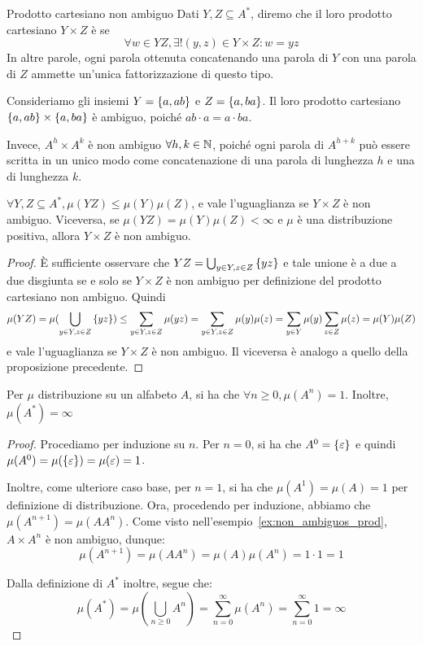 \begin{definition}{Prodotto cartesiano non ambiguo}
  Dati \(Y,Z \subseteq A^*\), diremo che il loro prodotto cartesiano \(Y\times Z\) è  se
    \[\forall w \in YZ, \exists! (y,z) \in Y \times Z : w = yz\]
  In altre parole, ogni parola ottenuta concatenando una parola di \(Y\) con una parola di \(Z\) ammette un'unica fattorizzazione di questo tipo.
\end{definition}

\begin{example}[label=ex:non_ambiguos_prod]{}
  Consideriamo gli insiemi \(Y = \set{a,ab}\) e \(Z = \set{a,ba}\).
  Il loro prodotto cartesiano \(\set{a,ab}\times\set{a,ba}\) è ambiguo, poiché \(ab\cdot a = a\cdot ba\).

  Invece, \(A^h\times A^k\) è non ambiguo \(\forall h,k \in \mathbb{N}\), poiché ogni parola di \(A^{h+k}\) può essere scritta in un unico modo come concatenazione di una parola di lunghezza \(h\) e una di lunghezza \(k\).
\end{example}
\begin{proposition}[label=prop:distribution_distributivity_over_product]{}
  \(\forall Y,Z \subseteq A^*, \mu(YZ) \leq \mu(Y)\mu(Z)\), e vale l'uguaglianza se \(Y\times Z\) è non ambiguo.
  Viceversa, se \(\mu(YZ) = \mu(Y)\mu(Z) < \infty\) e \(\mu\) è una distribuzione positiva, allora \(Y\times Z\) è non ambiguo.
\end{proposition}
\begin{proof}
  È sufficiente osservare che \(YZ = \bigcup_{y\in Y, z \in Z}\set{yz}\) e tale unione è a due a due disgiunta se e solo se \(Y\times Z\) è non ambiguo per definizione del prodotto cartesiano non ambiguo.
  Quindi
  \[\mu(YZ) = \mu(\bigcup_{y\in Y, z \in Z}\set{yz}) \leq \sum_{y\in Y, z \in Z}\mu(yz) = \sum_{y\in Y, z \in Z}\mu(y)\mu(z) =\sum_{y \in Y}\mu(y) \sum_{z \in Z}\mu(z) = \mu(Y)\mu(Z)\]
  e vale l'uguaglianza se \(Y\times Z\) è non ambiguo.
  Il viceversa è analogo a quello della proposizione precedente.
\end{proof}

\begin{proposition}[label=prop:A_power_mesure_1]{}
  Per \(\mu\) distribuzione su un alfabeto \(A\), si ha che \(\forall n \geq 0, \mu(A^n) = 1\).
  Inoltre, \(\mu(A^*) = \infty\)
\end{proposition}
\begin{proof}
  Procediamo per induzione su \(n\).
  Per \(n=0\), si ha che \(A^0 = \set{\varepsilon}\) e quindi \(\mu(A^0) = \mu(\set{\varepsilon}) = \mu(\varepsilon) = 1\).

  Inoltre, come ulteriore caso base, per \(n=1\), si ha che \(\mu(A^1) = \mu(A) = 1\) per definizione di distribuzione.
  Ora, procedendo per induzione, abbiamo che \(\mu(A^{n+1}) = \mu(AA^n)\).
  Come visto nell'esempio~\ref{ex:non_ambiguos_prod}, \(A \times A^n\) è non ambiguo, dunque:
  \[\mu(A^{n+1}) = \mu(AA^n) = \mu(A)\mu(A^n) = 1 \cdot 1 = 1 \]

  Dalla definizione di \(A^*\) inoltre, segue che:
  \[\mu(A^*) = \mu(\bigcup_{n\geq0} A^n) = \sum_{n=0}^{\infty} \mu(A^n) = \sum_{n=0}^{\infty} 1 = \infty\]
\end{proof}

